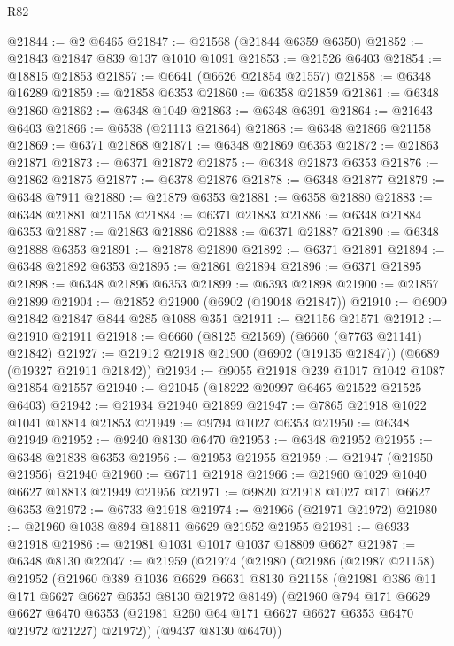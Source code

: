\begin{lexlean}{R82}
\begin{coremodule}
@21844 := @2 @6465
@21847 := @21568 (@21844 @6359 @6350)
@21852 := @21843 @21847 @839 @137 @1010 @1091
@21853 := @21526 @6403
@21854 := @18815 @21853
@21857 := @6641 (@6626 @21854 @21557)
@21858 := @6348 @16289
@21859 := @21858 @6353
@21860 := @6358 @21859
@21861 := @6348 @21860
@21862 := @6348 @1049
@21863 := @6348 @6391
@21864 := @21643 @6403
@21866 := @6538 (@21113 @21864)
@21868 := @6348 @21866 @21158
@21869 := @6371 @21868
@21871 := @6348 @21869 @6353
@21872 := @21863 @21871
@21873 := @6371 @21872
@21875 := @6348 @21873 @6353
@21876 := @21862 @21875
@21877 := @6378 @21876
@21878 := @6348 @21877
@21879 := @6348 @7911
@21880 := @21879 @6353
@21881 := @6358 @21880
@21883 := @6348 @21881 @21158
@21884 := @6371 @21883
@21886 := @6348 @21884 @6353
@21887 := @21863 @21886
@21888 := @6371 @21887
@21890 := @6348 @21888 @6353
@21891 := @21878 @21890
@21892 := @6371 @21891
@21894 := @6348 @21892 @6353
@21895 := @21861 @21894
@21896 := @6371 @21895
@21898 := @6348 @21896 @6353
@21899 := @6393 @21898
@21900 := @21857 @21899
@21904 := @21852 @21900 (@6902 (@19048 @21847))
@21910 := @6909 @21842 @21847 @844 @285 @1088 @351
@21911 := @21156 @21571
@21912 := @21910 @21911
@21918 := @6660 (@8125 @21569) (@6660 (@7763 @21141) @21842)
@21927 := @21912 @21918 @21900 (@6902 (@19135 @21847)) (@6689 (@19327 @21911 @21842))
@21934 := @9055 @21918 @239 @1017 @1042 @1087 @21854 @21557
@21940 := @21045 (@18222 @20997 @6465 @21522 @21525 @6403)
@21942 := @21934 @21940 @21899
@21947 := @7865 @21918 @1022 @1041 @18814 @21853
@21949 := @9794 @1027 @6353
@21950 := @6348 @21949
@21952 := @9240 @8130 @6470
@21953 := @6348 @21952
@21955 := @6348 @21838 @6353
@21956 := @21953 @21955
@21959 := @21947 (@21950 @21956) @21940
@21960 := @6711 @21918
@21966 := @21960 @1029 @1040 @6627 @18813 @21949 @21956
@21971 := @9820 @21918 @1027 @171 @6627 @6353
@21972 := @6733 @21918
@21974 := @21966 (@21971 @21972)
@21980 := @21960 @1038 @894 @18811 @6629 @21952 @21955
@21981 := @6933 @21918
@21986 := @21981 @1031 @1017 @1037 @18809 @6627
@21987 := @6348 @8130
@22047 := @21959
    (@21974
      (@21980
        (@21986
          (@21987 @21158)
          @21952
          (@21960
            @389
            @1036
            @6629
            @6631
            @8130
            @21158
            (@21981 @386 @11 @171 @6627 @6627 @6353 @8130 @21972 @8149)
            (@21960
              @794
              @171
              @6629
              @6627
              @6470
              @6353
              (@21981 @260 @64 @171 @6627 @6627 @6353 @6470 @21972 @21227)
              @21972))
          (@9437 @8130 @6470))

\end{coremodule}
\end{lexlean}
